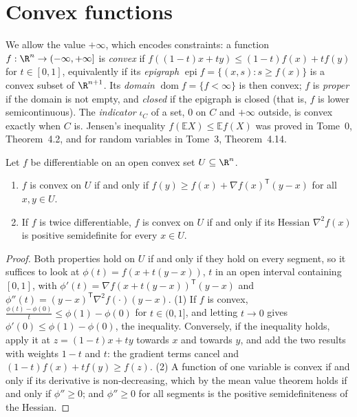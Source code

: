 \section{Convex functions}\label{sec:convexfunctions}

We allow the value $+\infty$, which encodes constraints: a function $f:\R^n\to(-\infty,+\infty]$ is \emph{convex} if
$f((1-t)x+ty)\le(1-t)f(x)+tf(y)$ for $t\in[0,1]$, equivalently if its \emph{epigraph} $\operatorname{epi}f=\{(x,s):s\ge f(x)\}$ is a convex subset of $\R^{n+1}$. Its
\emph{domain} $\operatorname{dom}f=\{f<\infty\}$ is then convex; $f$ is \emph{proper} if the domain is not empty, and \emph{closed} if the epigraph is closed (that is, $f$ is lower
semicontinuous). The \emph{indicator} $\iota_C$ of a set, $0$ on $C$ and $+\infty$ outside, is convex exactly when $C$ is. Jensen's inequality
$f(\mathbb EX)\le\mathbb Ef(X)$ was proved in Tome~0, Theorem~4.2, and for random variables in Tome~3, Theorem~4.14.

\begin{proposition}\label{prop:convextests}
Let $f$ be differentiable on an open convex set $U\subseteq\R^n$.
\begin{enumerate}
\item $f$ is convex on $U$ if and only if $f(y)\ge f(x)+\nabla f(x)^{\mathsf T}(y-x)$ for all $x,y\in U$.
\item If $f$ is twice differentiable, $f$ is convex on $U$ if and only if its Hessian $\nabla^2f(x)$ is positive semidefinite for every $x\in U$.
\end{enumerate}
\end{proposition}
\begin{proof}
Both properties hold on $U$ if and only if they hold on every segment, so it suffices to look at $\phi(t)=f(x+t(y-x))$, $t$ in an open interval containing $[0,1]$, with
$\phi'(t)=\nabla f(x+t(y-x))^{\mathsf T}(y-x)$ and $\phi''(t)=(y-x)^{\mathsf T}\nabla^2f(\cdot)(y-x)$. (1) If $f$ is convex, $\frac{\phi(t)-\phi(0)}t\le\phi(1)-\phi(0)$ for
$t\in(0,1]$, and letting $t\to0$ gives $\phi'(0)\le\phi(1)-\phi(0)$, the inequality. Conversely, if the inequality holds, apply it at $z=(1-t)x+ty$ towards $x$ and towards $y$,
and add the two results with weights $1-t$ and $t$: the gradient terms cancel and $(1-t)f(x)+tf(y)\ge f(z)$. (2) A function of one variable is convex if and only if
its derivative is non-decreasing, which by the mean value theorem holds if and only if $\phi''\ge0$; and $\phi''\ge0$ for all segments is the positive
semidefiniteness of the Hessian.
\end{proof}

